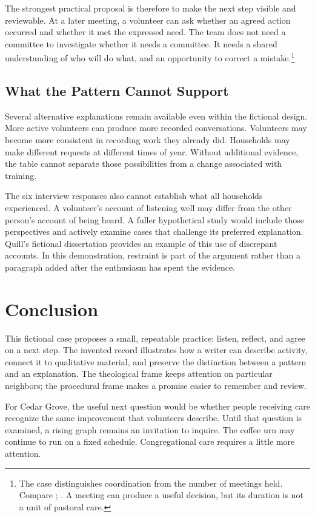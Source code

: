 \documentclass[font=termes]{mbts}
\begin{document}
The strongest practical proposal is therefore to make the next step visible
and reviewable. At a later meeting, a volunteer can ask whether an agreed
action occurred and whether it met the expressed need. The team does not
need a committee to investigate whether it needs a committee. It needs a
shared understanding of who will do what, and an opportunity to correct a
mistake.\footnote{The case distinguishes coordination from the number of meetings
held. Compare \cite[97]{mercer-meetings}; \cite[66--68]{vale-bell}. A meeting can
produce a useful decision, but its duration is not a unit of pastoral care.}

\subsection{What the Pattern Cannot Support}
Several alternative explanations remain available even within the fictional
design. More active volunteers can produce more recorded conversations.
Volunteers may become more consistent in recording work they already did.
Households may make different requests at different times of year. Without
additional evidence, the table cannot separate those possibilities from a
change associated with training.\autocite[56]{wren-measures}

The six interview responses also cannot establish what all households
experienced. A volunteer's account of listening well may differ from the
other person's account of being heard. A fuller hypothetical study would
include those perspectives and actively examine cases that challenge its
preferred explanation. Quill's fictional dissertation provides an example of
this use of discrepant accounts.\autocite[121--24]{quill-thesis}
In this demonstration, restraint is part of the argument rather than a
paragraph added after the enthusiasm has spent the evidence.

\clearpage
\section{Conclusion}
This fictional case proposes a small, repeatable practice: listen, reflect,
and agree on a next step. The invented record illustrates how a writer can
describe activity, connect it to qualitative material, and preserve the
distinction between a pattern and an explanation. The theological frame
keeps attention on particular neighbors; the procedural frame makes a
promise easier to remember and review.

For Cedar Grove, the useful next question would be whether people receiving
care recognize the same improvement that volunteers describe. Until that
question is examined, a rising graph remains an invitation to inquire.
The coffee urn may continue to run on a fixed schedule. Congregational
care requires a little more attention.
\end{document}
